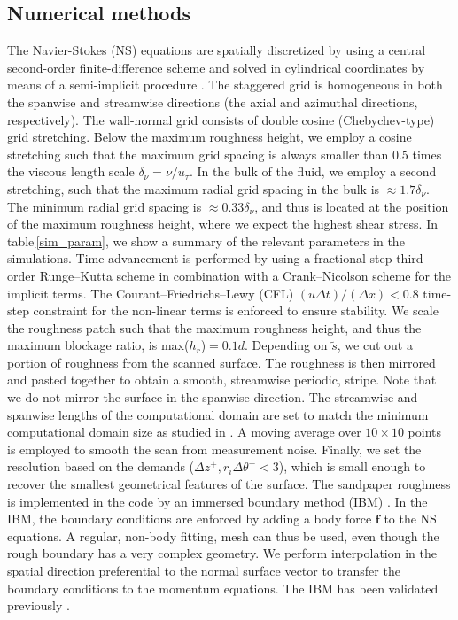 \subsection{Numerical methods}\label{sec:num_methods}
The Navier-Stokes (NS) equations are spatially discretized by using a central second-order finite-difference scheme and solved in cylindrical coordinates by means of a semi-implicit procedure \citep{Verzicco1996, vanderPoel2015}. The staggered grid is homogeneous in both the spanwise and streamwise directions (the axial and azimuthal directions, respectively). The wall-normal grid consists of double cosine (Chebychev-type) grid stretching. Below the maximum roughness height, we employ a cosine stretching such that the maximum grid spacing is always smaller than $0.5$ times the viscous length scale $\delta_\nu=\nu/u_\tau$. In the bulk of the fluid, we employ a second stretching, such that the maximum radial grid spacing in the bulk is  $\approx 1.7\delta_\nu$. The minimum radial grid spacing is $\approx 0.33 \delta_\nu$, and thus is located at the position of the maximum roughness height, where we expect the highest shear stress. In table\,\ref{sim_param}, we show a summary of the relevant parameters in the simulations. Time advancement is performed by using a fractional-step third-order Runge--Kutta scheme in combination with a Crank--Nicolson scheme for the implicit terms. The Courant--Friedrichs--Lewy (CFL) $(u\Delta t)/ (\Delta x)<0.8$ time-step constraint for the non-linear terms is enforced to ensure stability.
We scale the roughness patch such that the maximum roughness height, and thus the maximum blockage ratio, is max($h_r$)$=0.1d$. Depending on $\tilde{s}$, we cut out a portion of roughness from the scanned surface. The roughness is then mirrored and pasted together to obtain a smooth, streamwise periodic, stripe. Note that we do not mirror the surface in the spanwise direction. The streamwise and spanwise lengths of the computational domain are set to match the minimum computational domain size as studied in \cite{Ostilla-Monico2014b}.
A moving average over $10\times 10$ points is employed to smooth the scan from measurement noise. Finally, we set the resolution based on the demands ($\Delta z^+, r_i \Delta \theta^+ < 3$), which is small enough to recover the smallest geometrical features of the surface. 
The sandpaper roughness is implemented in the code by an immersed boundary method (IBM) \citep{Fadlun2000}. In the IBM, the boundary conditions are enforced by adding a body force $\mathbf{f}$ to the NS equations. A regular, non-body fitting, mesh can thus be used, even though the rough boundary has a very complex geometry. We perform interpolation in the spatial direction preferential to the normal surface vector to transfer the boundary conditions to the momentum equations. The IBM has been validated previously \citep{Fadlun2000, Iaccarino2003, Stringano2006, Zhu2016, Zhu2017, Zhu2018}. 

